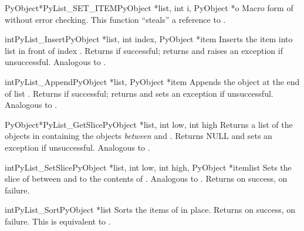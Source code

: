 \documentclass{manual}
\begin{document}
\begin{cfuncdesc}{PyObject*}{PyList_SET_ITEM}{PyObject *list, int i,
                                              PyObject *o}
Macro form of  without error checking.
  This function ``steals'' a reference to .
\end{cfuncdesc}

\begin{cfuncdesc}{int}{PyList_Insert}{PyObject *list, int index,
                                      PyObject *item}
Inserts the item  into list  in front of index
.  Returns  if successful; returns  and
raises an exception if unsuccessful.  Analogous to
.
\end{cfuncdesc}

\begin{cfuncdesc}{int}{PyList_Append}{PyObject *list, PyObject *item}
Appends the object  at the end of list .  Returns
 if successful; returns  and sets an exception if
unsuccessful.  Analogous to .
\end{cfuncdesc}

\begin{cfuncdesc}{PyObject*}{PyList_GetSlice}{PyObject *list,
                                              int low, int high}
Returns a list of the objects in  containing the objects 
\emph{between}  and .  Returns NULL and sets an
exception if unsuccessful.
Analogous to .
\end{cfuncdesc}

\begin{cfuncdesc}{int}{PyList_SetSlice}{PyObject *list,
                                        int low, int high,
                                        PyObject *itemlist}
Sets the slice of  between  and  to the
contents of .  Analogous to
.  Returns
 on success,  on failure.
\end{cfuncdesc}

\begin{cfuncdesc}{int}{PyList_Sort}{PyObject *list}
Sorts the items of  in place.  Returns  on success,
 on failure.  This is equivalent to
.
\end{cfuncdesc}
\end{document}
